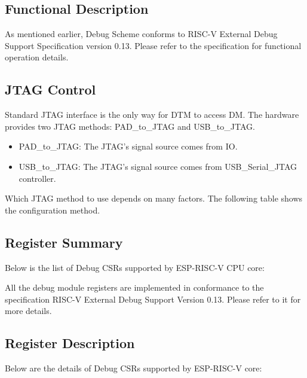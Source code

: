 \documentclass[main\_\_EN.tex]{subfiles}
\begin{document}
\subsection{Functional Description}
\label{sec:riscvcpu-dbg-func-descr}

As mentioned earlier, Debug Scheme conforms to RISC-V External Debug Support Specification version 0.13. Please refer to the specification for functional operation details.

\subsection{JTAG Control}
\label{sec:riscvcpu-dbg-jtag-cntl}

Standard JTAG interface is the only way for DTM to access DM. The hardware provides two JTAG methods: PAD\_to\_JTAG and USB\_to\_JTAG.

\begin{itemize}
    \item {PAD\_to\_JTAG: The JTAG's signal source comes from IO.}
    \item {USB\_to\_JTAG: The JTAG's signal source comes from USB\_Serial\_JTAG controller.}
\end{itemize}

Which JTAG method to use depends on many factors. The following table shows the configuration method.






\hypertarget{riscvcpu-dbg-reg-summ}{}
\subsection{Register Summary}
\label{sec:riscvcpu-dbg-reg-summ}


Below is the list of Debug CSRs supported by ESP-RISC-V CPU core:


All the debug module registers are implemented in conformance to the specification RISC-V External Debug Support Version 0.13. Please refer to it for more details.



\subsection{Register Description}
Below are the details of Debug CSRs supported by ESP-RISC-V core:
\end{document}

